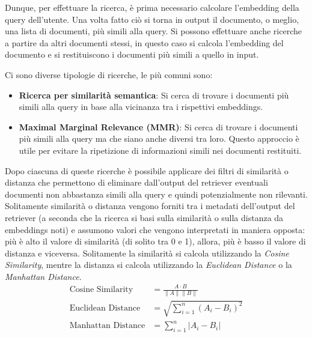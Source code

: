Dunque, per effettuare la ricerca, è prima necessario calcolare l'embedding della query dell'utente. Una volta fatto ciò si torna in output il documento, o meglio, una lista di documenti, più simili alla query. Si possono effettuare anche ricerche a partire da altri documenti stessi, in questo caso si calcola l'embedding del documento e si restituiscono i documenti più simili a quello in input.

Ci sono diverse tipologie di ricerche, le più comuni sono:
\begin{itemize}
    \item \textbf{Ricerca per similarità semantica}: Si cerca di trovare i documenti più simili alla query in base alla vicinanza tra i rispettivi embeddings.
    \item \textbf{Maximal Marginal Relevance (MMR)}: Si cerca di trovare i documenti più simili alla query ma che siano anche diversi tra loro. Questo approccio è utile per evitare la ripetizione di informazioni simili nei documenti restituiti.
\end{itemize}
Dopo ciascuna di queste ricerche è possibile applicare dei filtri di similarità o distanza che permettono di eliminare dall'output del retriever eventuali documenti non abbastanza simili alla query e quindi potenzialmente non rilevanti. Solitamente similarità o distanza vengono forniti tra i metadati dell'output del retriever (a seconda che la ricerca si basi sulla similarità o sulla distanza da embeddings noti) e assumono valori che vengono interpretati in maniera opposta: più è alto il valore di similarità (di solito tra 0 e 1), allora, più è basso il valore di distanza e viceversa. Solitamente la similarità si calcola utilizzando la \textit{Cosine Similarity}, mentre la distanza si calcola utilizzando la \textit{Euclidean Distance} o la \textit{Manhattan Distance}.
\begin{align}
    \text{Cosine Similarity} &= \frac{A \cdot B}{\|A\| \|B\|} \\
    \text{Euclidean Distance} &= \sqrt{\sum_{i=1}^{n} (A_i - B_i)^2} \\
    \text{Manhattan Distance} &= \sum_{i=1}^{n} |A_i - B_i|
\end{align}

